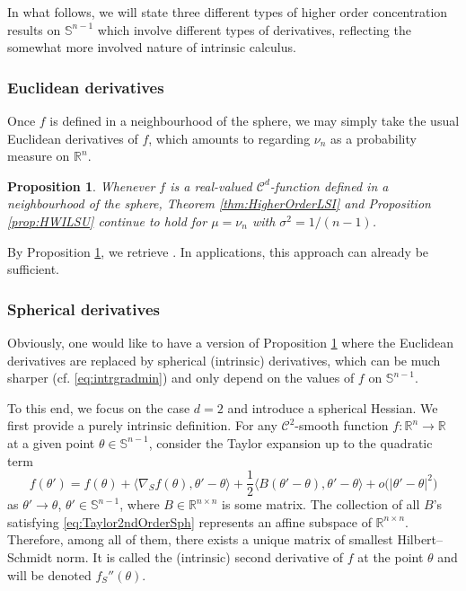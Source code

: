 \documentclass[a4paper,12pt]{amsart}
\numberwithin{equation}{section}
\newtheorem{proposition}[satz]{Proposition}
\theoremstyle{remark}
\def\R{{\mathbb R}}
\def\S{{\mathbb S}}
\begin{document}
In what follows, we will state three different types of higher order concentration results on $\S^{n-1}$ which involve different types of derivatives, reflecting the somewhat more involved nature of intrinsic calculus.

\subsubsection{Euclidean derivatives}
Once $f$ is defined in a neighbourhood of the sphere, we may simply take the usual Euclidean derivatives of $f$, which amounts to regarding $\nu_n$ as a probability measure on $\R^n$.

\begin{proposition}\label{prop:HigherOrderSphereEucl}
Whenever $f$ is a real-valued $\mathcal{C}^d$-function defined in a neighbourhood of the sphere, Theorem \ref{thm:HigherOrderLSI} and Proposition \ref{prop:HWILSU} continue to hold for $\mu = \nu_n$ with $\sigma^2 = 1/(n-1)$.
\end{proposition}

By Proposition \ref{prop:HigherOrderSphereEucl}, we retrieve \cite[Th.\ 1.13]{BGS19}. In applications, this approach can already be sufficient.

\subsubsection{Spherical derivatives}
Obviously, one would like to have a version of Proposition \ref{prop:HigherOrderSphereEucl} where the Euclidean derivatives are replaced by spherical (intrinsic) derivatives, which can be much sharper (cf. \eqref{eq:intrgradmin}) and only depend on the values of $f$ on $\S^{n-1}$.

To this end, we focus on the case $d=2$ and introduce a spherical Hessian. We first provide a purely intrinsic definition. For any $\mathcal{C}^2$-smooth function $f \colon \mathbb{R}^n \to \mathbb{R}$ at a given point $\theta \in \S^{n-1}$, consider the Taylor expansion up to the quadratic term
\begin{equation}\label{eq:Taylor2ndOrderSph}
	f(\theta') = f(\theta) + \langle\nabla_S f(\theta), \theta'-\theta\rangle + \frac{1}{2} \langle B(\theta'-\theta), \theta'-\theta \rangle + o\big(|\theta' - \theta|^2\big)
\end{equation}
as $\theta' \rightarrow \theta$, $\theta' \in \S^{n-1}$, where $B \in \mathbb{R}^{n \times n}$ is some matrix. The collection of all $B$'s satisfying \eqref{eq:Taylor2ndOrderSph} represents an affine subspace of $\mathbb{R}^{n \times n}$. Therefore, among all of them, there exists a unique matrix of smallest Hilbert--Schmidt norm. It is called the (intrinsic) second derivative of $f$ at the point $\theta$ and will be denoted $f_S''(\theta)$.
\end{document}
